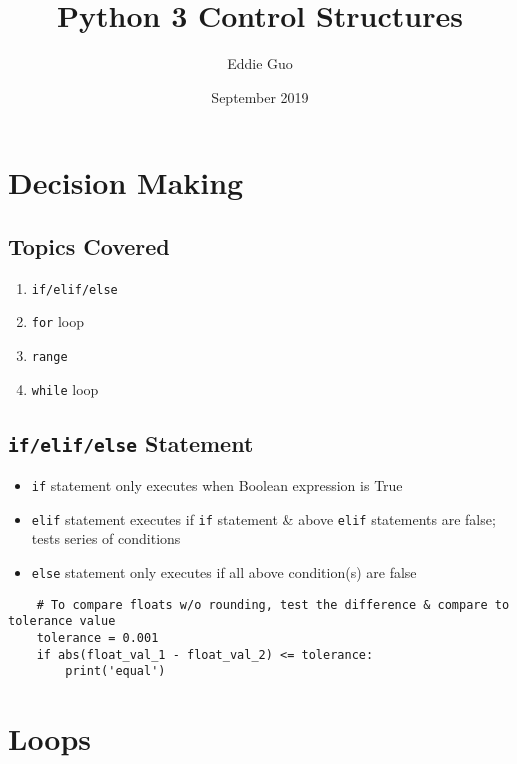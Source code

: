 \documentclass{article}
\title{Python 3 Control Structures}
\author{Eddie Guo}
\date{September 2019}
\begin{document}
\lstset{language=Python}
\maketitle

\section{Decision Making}
\subsection{Topics Covered}
    \begin{multicols}{2}
        \begin{enumerate}[label=(\roman*)]
            \item \texttt{if/elif/else}
            \item \texttt{for} loop
            \item \texttt{range}
            \item \texttt{while} loop
        \end{enumerate}
    \end{multicols}

\subsection{\texttt{if/elif/else} Statement}
    \begin{itemize}
        \item \texttt{if} statement only executes when Boolean expression is True
        \item \texttt{elif} statement executes if \texttt{if} statement \& above \texttt{elif} statements are false; tests series of conditions
        \item \texttt{else} statement only executes if all above condition(s) are false
    \end{itemize}
\vspace{-1em}
\begin{lstlisting}
    # To compare floats w/o rounding, test the difference & compare to tolerance value
    tolerance = 0.001
    if abs(float_val_1 - float_val_2) <= tolerance:
        print('equal')
\end{lstlisting}

\section{Loops}
\end{document}
